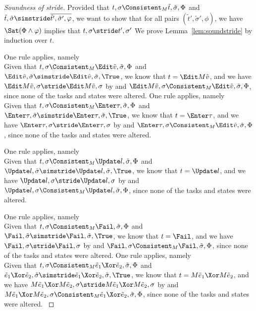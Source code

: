 \begin{proof}[Soundness of stride]

  Provided that $t,\sigma\Consistent_M\tilde{t},\tilde{\sigma},\Phi$ and $\tilde{t},\tilde{\sigma}\simstride \overline{\tilde{t}',\tilde{\sigma}',\phi}$,
  we want to show that for all pairs $(\tilde{t}',\tilde{\sigma}',\phi)$,
  we have $\Sat(\Phi\land\phi)$ implies that $t,\sigma\stride t',\sigma'$
  We prove Lemma~\ref{lem:soundstride} by induction over $t$.



  { One rule applies, namely \\
    Given that $t,\sigma\Consistent_M\Edit\tilde{v},\tilde{\sigma},\Phi$ and $\Edit\tilde{v},\tilde{\sigma}\simstride\Edit\tilde{v},\tilde{\sigma},\True$,
    we know that $t=\Edit M \tilde{v}$, and we have $\Edit M \tilde{v},\sigma\stride\Edit M\tilde{v},\sigma$ by  and
    $\Edit M \tilde{v},\sigma\Consistent_M\Edit\tilde{v},\tilde{\sigma},\Phi$, since none of the tasks and states were altered.
   }
  {One rule applies, namely \\
  Given that $t,\sigma\Consistent_M\Enter \tau,\tilde{\sigma},\Phi$ and $\Enter \tau,\tilde{\sigma}\simstride\Enter \tau,\tilde{\sigma},\True$,
  we know that $t=\Enter \tau$, and we have $\Enter \tau,\sigma\stride\Enter \tau,\sigma$ by  and
  $\Enter \tau,\sigma\Consistent_M\Edit\tilde{v},\tilde{\sigma},\Phi$, since none of the tasks and states were altered.
  }

   {One rule applies, namely \\
   Given that $t,\sigma\Consistent_M\Update l,\tilde{\sigma},\Phi$ and $\Update l,\tilde{\sigma}\simstride\Update l,\tilde{\sigma},\True$,
   we know that $t=\Update l$, and we have $\Update l,\sigma\stride\Update l,\sigma$ by  and
   $\Update l,\sigma\Consistent_M\Update l,\tilde{\sigma},\Phi$, since none of the tasks and states were altered.
  }

   {One rule applies, namely \\
   Given that $t,\sigma\Consistent_M\Fail,\tilde{\sigma},\Phi$ and $\Fail,\tilde{\sigma}\simstride\Fail,\tilde{\sigma},\True$,
   we know that $t=\Fail$, and we have $\Fail,\sigma\stride\Fail,\sigma$ by  and
   $\Fail,\sigma\Consistent_M\Fail,\tilde{\sigma},\Phi$, since none of the tasks and states were altered.
   }
   {One rule applies, namely \\
   Given that $t,\sigma\Consistent_M\tilde{e}_1\Xor \tilde{e}_2,\tilde{\sigma},\Phi$ and $\tilde{e}_1\Xor \tilde{e}_2,\tilde{\sigma}\simstride\tilde{e}_1\Xor \tilde{e}_2,\tilde{\sigma},\True$,
   we know that $t=M\tilde{e}_1\Xor M\tilde{e}_2$, and we have $M\tilde{e}_1\Xor M\tilde{e}_2,\sigma\stride M\tilde{e}_1\Xor M\tilde{e}_2,\sigma$ by  and
   $M\tilde{e}_1\Xor M\tilde{e}_2,\sigma\Consistent_M\tilde{e}_1\Xor \tilde{e}_2,\tilde{\sigma},\Phi$, since none of the tasks and states were altered.
   }





\end{proof}
